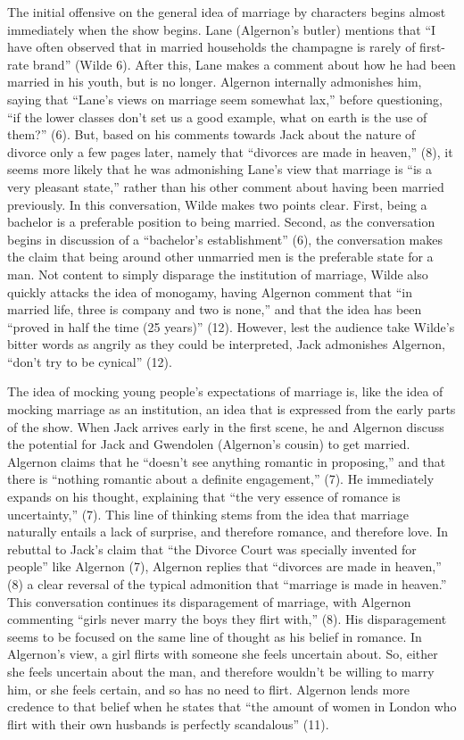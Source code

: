 \documentclass[12pt]{article}[titlepage]
\newcommand{\say}[1]{``#1''}
\newcommand{\1}{\={a}}
\newcommand{\2}{\={e}}
\newcommand{\3}{\={\i}}
\newcommand{\4}{\=o}
\newcommand{\5}{\=u}
\newcommand{\6}{\={A}}
\renewcommand{\,}{\textsuperscript{,}}
\begin{document}
The initial offensive on the general idea of marriage by characters begins almost immediately when the show begins.
Lane (Algernon's butler) mentions that \say{I have often observed that in married households the champagne is rarely of first-rate brand} (Wilde 6).
After this, Lane makes a comment about how he had been married in his youth, but is no longer.
Algernon internally admonishes him, saying that \say{Lane's views on marriage seem somewhat lax,} before questioning, \say{if the lower classes don't set us a good example, what on earth is the use of them?} (6).
But, based on his comments towards Jack about the nature of divorce only a few pages later, namely that \say{divorces are made in heaven,} (8), it seems more likely that he was admonishing Lane's view that marriage is \say{is a very pleasant state,} rather than his other comment about having been married previously.
In this conversation, Wilde makes two points clear.
First, being a bachelor is a preferable position to being married.
Second, as the conversation begins in discussion of a \say{bachelor's establishment} (6), the conversation makes the claim that being around other unmarried men is the preferable state for a man.
Not content to simply disparage the institution of marriage, Wilde also quickly attacks the idea of monogamy, having Algernon comment that \say{in married life, three is company and two is none,} and that the idea has been \say{proved in half the time (25 years)} (12).
However, lest the audience take Wilde's bitter words as angrily as they could be interpreted, Jack admonishes Algernon, \say{don't try to be cynical} (12).

The idea of mocking young people's expectations of marriage is, like the idea of mocking marriage as an institution, an idea that is expressed from the early parts of the show.
When Jack arrives early in the first scene, he and Algernon discuss the potential for Jack and Gwendolen (Algernon's cousin) to get married.
Algernon claims that he \say{doesn't see anything romantic in proposing,} and that there is \say{nothing romantic about a definite engagement,} (7).
He immediately expands on his thought, explaining that \say{the very essence of romance is uncertainty,} (7).
This line of thinking stems from the idea that marriage naturally entails a lack of surprise, and therefore romance, and therefore love.
In rebuttal to Jack's claim that \say{the Divorce Court was specially invented for people} like Algernon (7), Algernon replies that \say{divorces are made in heaven,} (8) a clear reversal of the typical admonition that \say{marriage is made in heaven.}
This conversation continues its disparagement of marriage, with Algernon commenting \say{girls never marry the boys they flirt with,} (8).
His disparagement seems to be focused on the same line of thought as his belief in romance.
In Algernon's view, a girl flirts with someone she feels uncertain about.
So, either she feels uncertain about the man, and therefore wouldn't be willing to marry him, or she feels certain, and so has no need to flirt.
Algernon lends more credence to that belief when he states that \say{the amount of women in London who flirt with their own husbands is perfectly scandalous} (11).
\end{document}
